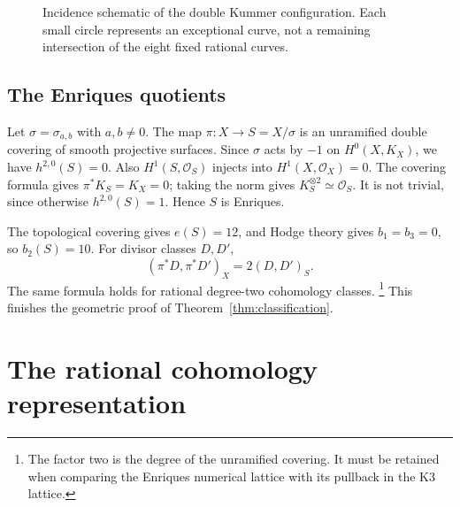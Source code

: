 \documentclass[11pt]{amsart}
\theoremstyle{definition}
\begin{document}
\begin{figure}[tb]
\centering
{}
\caption{Incidence schematic of the double Kummer configuration.
Each small circle represents an exceptional curve, not a remaining
intersection of the eight fixed rational curves.}
\label{fig:grid}
\end{figure}

\subsection{The Enriques quotients}
Let $\sigma=\sigma_{a,b}$ with $a,b\ne0$. The map $\pi:X\to S=X/\sigma$
is an unramified double covering of smooth projective surfaces. Since
$\sigma$ acts by $-1$ on $H^0(X,K_X)$, we have $h^{2,0}(S)=0$.
Also $H^1(S,\mathcal O_S)$ injects into $H^1(X,\mathcal O_X)=0$.
The covering formula gives $\pi^*K_S=K_X=0$; taking the norm gives
$K_S^{\otimes2}\simeq\mathcal O_S$. It is not trivial, since otherwise
$h^{2,0}(S)=1$. Hence $S$ is Enriques.

The topological covering gives $e(S)=12$, and Hodge theory gives
$b_1=b_3=0$, so $b_2(S)=10$. For divisor classes $D,D'$,
\begin{equation}\label{eq:intersection}
 (\pi^*D,\pi^*D')_X=2(D,D')_S.
\end{equation}
The same formula holds for rational degree-two cohomology classes.
\footnote{The factor two is the degree of the unramified covering. It
must be retained when comparing the Enriques numerical lattice with
its pullback in the K3 lattice.}
This finishes the geometric proof of
Theorem~\ref{thm:classification}.

\section{The rational cohomology representation}
\end{document}
